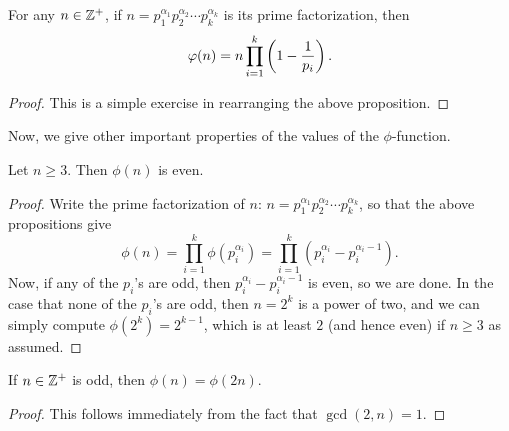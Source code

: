 \documentclass{article}
\begin{document}
\begin{proposition}
For any $n\in\mathbb Z^+$, if $n = p_1^{\alpha_1} p_2^{\alpha_2}\cdots p_k^{\alpha_k}$ is its prime factorization, then
$$\varphi(n) = n\prod_{i=1}^k \left(1 - \frac 1{p_i} \right).$$
\end{proposition}
\begin{proof}
This is a simple exercise in rearranging the above proposition.
\end{proof}

Now, we give other important properties of the values of the $\phi$-function.
\begin{proposition}
Let $n\geq 3$. Then $\phi(n)$ is even.
\end{proposition}
\begin{proof}
Write the prime factorization of $n$: $n = p_1^{\alpha_1} p_2^{\alpha_2}\cdots p_k^{\alpha_k}$, so that the above propositions give
$$\phi(n) = \prod_{i=1}^k \phi(p_i^{\alpha_i}) = \prod_{i=1}^k (p_i^{\alpha_i} - p_i^{\alpha_i-1}).$$
Now, if any of the $p_i$'s are odd, then $p_i^{\alpha_i} - p_i^{\alpha_i-1}$ is even, so we are done. In the case that none of the $p_i$'s are odd, then $n = 2^k$ is a power of two, and we can simply compute $\phi(2^k) = 2^{k-1}$, which is at least $2$ (and hence even) if $n\geq 3$ as assumed.
\end{proof}

\begin{proposition}
If $n\in\mathbb Z^+$ is odd, then $\phi(n) = \phi(2n)$.
\end{proposition}
\begin{proof}
This follows immediately from the fact that $\gcd(2,n) = 1$.
\end{proof}
\end{document}
